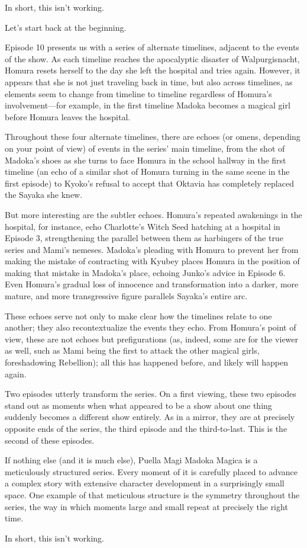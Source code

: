 In short, this isn't working.

Let's start back at the beginning.

Episode 10 presents us with a series of alternate timelines, adjacent to the events of the show. As each timeline reaches the apocalyptic disaster of Walpurgisnacht, Homura resets herself to the day she left the hospital and tries again. However, it appears that she is not just traveling back in time, but also across timelines, as elements seem to change from timeline to timeline regardless of Homura's involvement—for example, in the first timeline Madoka becomes a magical girl before Homura leaves the hospital.

Throughout these four alternate timelines, there are echoes (or omens, depending on your point of view) of events in the series' main timeline, from the shot of Madoka's shoes as she turns to face Homura in the school hallway in the first timeline (an echo of a similar shot of Homura turning in the same scene in the first episode) to Kyoko's refusal to accept that Oktavia has completely replaced the Sayaka she knew.

But more interesting are the subtler echoes. Homura's repeated awakenings in the hospital, for instance, echo Charlotte's Witch Seed hatching at a hospital in Episode 3, strengthening the parallel between them as harbingers of the true series and Mami's nemeses. Madoka's pleading with Homura to prevent her from making the mistake of contracting with Kyubey places Homura in the position of making that mistake in Madoka's place, echoing Junko's advice in Episode 6. Even Homura's gradual loss of innocence and transformation into a darker, more mature, and more transgressive figure parallels Sayaka's entire arc.

These echoes serve not only to make clear how the timelines relate to one another; they also recontextualize the events they echo. From Homura's point of view, these are not echoes but prefigurations (as, indeed, some are for the viewer as well, such as Mami being the first to attack the other magical girls, foreshadowing Rebellion); all this has happened before, and likely will happen again.

Two episodes utterly transform the series. On a first viewing, these two episodes stand out as moments when what appeared to be a show about one thing suddenly becomes a different show entirely. As in a mirror, they are at precisely opposite ends of the series, the third episode and the third-to-last. This is the second of these episodes.

If nothing else (and it is much else), Puella Magi Madoka Magica is a meticulously structured series. Every moment of it is carefully placed to advance a complex story with extensive character development in a surprisingly small space. One example of that meticulous structure is the symmetry throughout the series, the way in which moments large and small repeat at precisely the right time.

In short, this isn't working.
